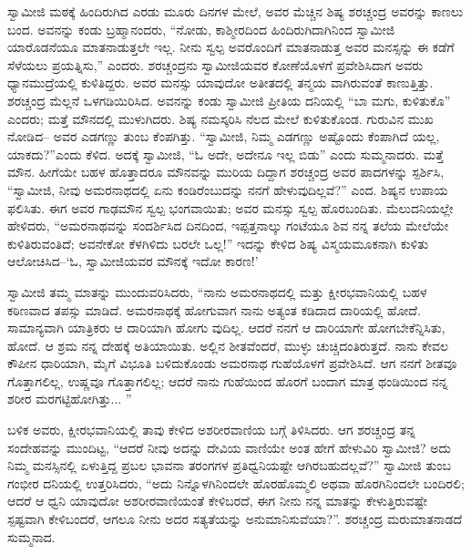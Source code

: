ಸ್ವಾಮೀಜಿ ಮಠಕ್ಕೆ ಹಿಂದಿರುಗಿದ ಎರಡು ಮೂರು ದಿನಗಳ ಮೇಲೆ, ಅವರ ಮೆಚ್ಚಿನ ಶಿಷ್ಯ ಶರಚ್ಚಂದ್ರ ಅವರನ್ನು ಕಾಣಲು ಬಂದ. ಅವನನ್ನು ಕಂಡು ಬ್ರಹ್ಮಾನಂದರು, “ನೋಡು, ಕಾಶ್ಮೀರದಿಂದ ಹಿಂದಿರುಗಿದಾಗಿನಿಂದ ಸ್ವಾಮೀಜಿ ಯಾರೊಡನೆಯೂ ಮಾತನಾಡುತ್ತಲೇ ಇಲ್ಲ. ನೀನು ಸ್ವಲ್ಪ ಅವರೊಂದಿಗೆ ಮಾತನಾಡುತ್ತ ಅವರ ಮನಸ್ಸನ್ನು ಈ ಕಡೆಗೆ ಸೆಳೆಯಲು ಪ್ರಯತ್ನಿಸು,” ಎಂದರು. ಶರಚ್ಚಂದ್ರನು ಸ್ವಾಮೀಜಿಯವರ ಕೋಣೆಯೊಳಗೆ ಪ್ರವೇಶಿಸಿದಾಗ ಅವರು ಧ್ಯಾನಮುದ್ರೆಯಲ್ಲಿ ಕುಳಿತಿದ್ದರು. ಅವರ ಮನಸ್ಸು ಯಾವುದೋ ಅತೀತದಲ್ಲಿ ತನ್ಮಯ ವಾಗಿರುವಂತೆ ಕಾಣುತ್ತಿತ್ತು. ಶರಚ್ಚಂದ್ರ ಮೆಲ್ಲನೆ ಒಳಗಡಿಯಿರಿಸಿದ. ಅವನನ್ನು ಕಂಡು ಸ್ವಾಮೀಜಿ ಪ್ರೀತಿಯ ದನಿಯಲ್ಲಿ “ಬಾ ಮಗು, ಕುಳಿತುಕೊ” ಎಂದರು; ಮತ್ತೆ ಮೌನದಲ್ಲಿ ಮುಳುಗಿದರು. ಶಿಷ್ಯ ನಮಸ್ಕರಿಸಿ ನೆಲದ ಮೇಲೆ ಕುಳಿತುಕೊಂಡ. ಗುರುವಿನ ಮುಖ ನೋಡಿದ– ಅವರ ಎಡಗಣ್ಣು ತುಂಬ ಕೆಂಪಗಿತ್ತು. “ಸ್ವಾಮೀಜಿ, ನಿಮ್ಮ ಎಡಗಣ್ಣು ಅಷ್ಟೊಂದು ಕೆಂಪಾಗಿದೆ ಯಲ್ಲ, ಯಾಕದು?”ಎಂದು ಕೆಳಿದ. ಅದಕ್ಕೆ ಸ್ವಾಮೀಜಿ, “ಓ ಅದೇ, ಅದೇನೂ ಇಲ್ಲ ಬಿಡು” ಎಂದು ಸುಮ್ಮನಾದರು. ಮತ್ತೆ ಮೌನ. ಹೀಗೆಯೇ ಬಹಳ ಹೊತ್ತಾದರೂ ಮೌನವನ್ನು ಮುರಿಯ ದಿದ್ದಾಗ ಶರಚ್ಚಂದ್ರ ಅವರ ಪಾದಗಳನ್ನು ಸ್ಪರ್ಶಿಸಿ, “ಸ್ವಾಮೀಜಿ, ನೀವು ಅಮರನಾಥದಲ್ಲಿ ಏನು ಕಂಡಿರೆಂಬುದನ್ನು ನನಗೆ ಹೇಳುವುದಿಲ್ಲವೆ?” ಎಂದ. ಶಿಷ್ಯನ ಉಪಾಯ ಫಲಿಸಿತು. ಈಗ ಅವರ ಗಾಢಮೌನ ಸ್ವಲ್ಪ ಭಂಗವಾಯಿತು; ಅವರ ಮನಸ್ಸು ಸ್ವಲ್ಪ ಹೊರಬಂದಿತು. ಮೆಲುದನಿಯಲ್ಲೇ ಹೇಳಿದರು, “ಅಮರನಾಥವನ್ನು ಸಂದರ್ಶಿಸಿದ ದಿನದಿಂದ, ಇಪ್ಪತ್ತನಾಲ್ಕು ಗಂಟೆಯೂ ಶಿವ ನನ್ನ ತಲೆಯ ಮೇಲೆಯೇ ಕುಳಿತಿರುವಂತಿದೆ; ಅವನೇಕೋ ಕೆಳಗಿಳಿದು ಬರಲೇ ಒಲ್ಲ!” ಇದನ್ನು ಕೇಳಿದ ಶಿಷ್ಯ ವಿಸ್ಮಯಮೂಕನಾಗಿ ಕುಳಿತು ಆಲೋಚಿಸಿದ–‘ಓ, ಸ್ವಾಮೀಜಿಯವರ ಮೌನಕ್ಕೆ ಇದೋ ಕಾರಣ!’

ಸ್ವಾಮೀಜಿ ತಮ್ಮ ಮಾತನ್ನು ಮುಂದುವರಿಸಿದರು, “ನಾನು ಅಮರನಾಥದಲ್ಲಿ ಮತ್ತು ಕ್ಷೀರಭವಾನಿಯಲ್ಲಿ ಬಹಳ ಕಠಿಣವಾದ ತಪಸ್ಸು ಮಾಡಿದೆ. ಅಮರನಾಥಕ್ಕೆ ಹೋಗುವಾಗ ನಾನು ಅತ್ಯಂತ ಕಡಿದಾದ ದಾರಿಯಲ್ಲಿ ಹೋದೆ. ಸಾಮಾನ್ಯವಾಗಿ ಯಾತ್ರಿಕರು ಆ ದಾರಿಯಾಗಿ ಹೋಗು ವುದಿಲ್ಲ. ಆದರೆ ನನಗೆ ಆ ದಾರಿಯಾಗೇ ಹೋಗಬೇಕೆನ್ನಿಸಿತು, ಹೋದೆ. ಆ ಶ್ರಮ ನನ್ನ ದೇಹಕ್ಕೆ ಅತಿಯಾಯಿತು. ಅಲ್ಲಿನ ಶೀತವೆಂದರೆ, ಮುಳ್ಳು ಚುಚ್ಚಿದಂತಿರುತ್ತದೆ. ನಾನು ಕೇವಲ ಕೌಪೀನ ಧಾರಿಯಾಗಿ, ಮೈಗೆ ವಿಭೂತಿ ಬಳಿದುಕೊಂಡು ಅಮರನಾಥ ಗುಹೆಯೊಳಗೆ ಪ್ರವೇಶಿಸಿದೆ. ಆಗ ನನಗೆ ಶೀತವೂ ಗೊತ್ತಾಗಲಿಲ್ಲ, ಉಷ್ಣವೂ ಗೊತ್ತಾಗಲಿಲ್ಲ; ಆದರೆ ನಾನು ಗುಹೆಯಿಂದ ಹೊರಗೆ ಬಂದಾಗ ಮಾತ್ರ ಥಂಡಿಯಿಂದ ನನ್ನ ಶರೀರ ಮರಗಟ್ಟಿಹೋಗಿತ್ತು... ”

ಬಳಿಕ ಅವರು, ಕ್ಷೀರಭವಾನಿಯಲ್ಲಿ ತಾವು ಕೇಳಿದ ಅಶರೀರವಾಣಿಯ ಬಗ್ಗೆ ತಿಳಿಸಿದರು. ಆಗ ಶರಚ್ಚಂದ್ರ ತನ್ನ ಸಂದೇಹವನ್ನು ಮುಂದಿಟ್ಟ, “ಆದರೆ ನೀವು ಅದನ್ನು ದೇವಿಯ ವಾಣಿಯೇ ಅಂತ ಹೇಗೆ ಹೇಳುವಿರಿ ಸ್ವಾಮೀಜಿ? ಅದು ನಿಮ್ಮ ಮನಸ್ಸಿನಲ್ಲಿ ಏಳುತ್ತಿದ್ದ ಪ್ರಬಲ ಭಾವನಾ ತರಂಗಗಳ ಪ್ರತಿಧ್ವನಿಯಷ್ಟೇ ಆಗಿರಬಹುದಲ್ಲವೆ?” ಸ್ವಾಮೀಜಿ ತುಂಬ ಗಂಭೀರ ದನಿಯಲ್ಲಿ ಉತ್ತರಿಸಿದರು, “ಅದು ನಿನ್ನೊಳಗಿನಿಂದಲೇ ಹೊರಹೊಮ್ಮಲಿ ಅಥವಾ ಹೊರಗಿನಿಂದಲೇ ಬಂದಿರಲಿ; ಆದರೆ ಆ ಧ್ವನಿ ಯಾವುದೋ ಅಶರೀರವಾಣಿಯಂತೆ ಕೇಳಿಬರದೆ, ಈಗ ನೀನು ನನ್ನ ಮಾತನ್ನು ಕೇಳುತ್ತಿರುವಷ್ಟೇ ಸ್ಪಷ್ಟವಾಗಿ ಕೇಳಿಬಂದರೆ, ಆಗಲೂ ನೀನು ಅದರ ಸತ್ಯತೆಯನ್ನು ಅನುಮಾನಿಸುವೆಯಾ?”. ಶರಚ್ಚಂದ್ರ ಮರುಮಾತನಾಡದೆ ಸುಮ್ಮನಾದ.

